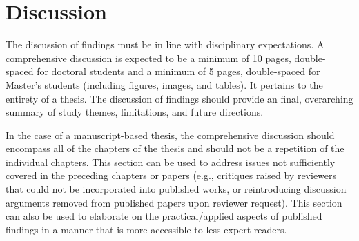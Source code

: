 \chapter{\rm\bfseries Discussion}
\label{ch:discussion}

\mcgillguidelines The discussion of findings must be in line with disciplinary expectations. A comprehensive discussion is expected to be a minimum of 10 pages, double-spaced for doctoral students and a minimum of 5 pages, double-spaced for Master’s students (including figures, images, and tables). It pertains to the entirety of a thesis. The discussion of findings should provide an final, overarching summary of study themes, limitations, and future directions.


In the case of a manuscript-based thesis, the comprehensive discussion should encompass all of the chapters of the thesis and should not be a repetition of the individual chapters. This section can be used to address issues not sufficiently covered in the preceding chapters or papers (e.g., critiques raised by reviewers that could not be incorporated into published works, or reintroducing discussion arguments removed from published papers upon reviewer request). This section can also be used to elaborate on the practical/applied aspects of published findings in a manner that is more accessible to less expert readers.